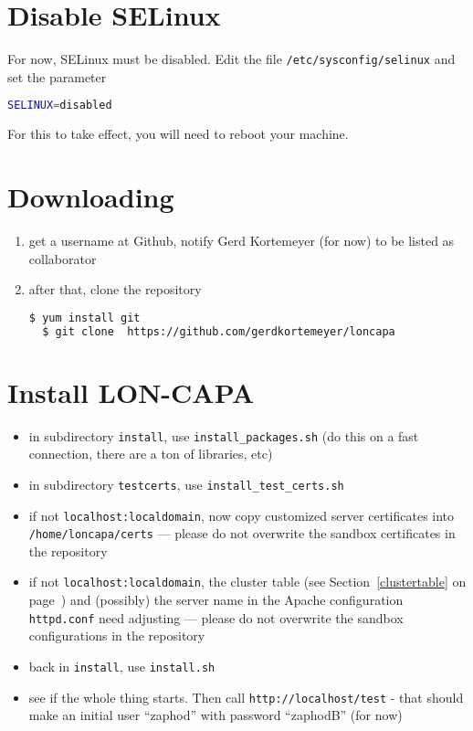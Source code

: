 \section{Disable SELinux}
For now, SELinux must be disabled.  Edit the file {\tt /etc/sysconfig/selinux} and set the parameter 
\begin{lstlisting}[language=bash]
  SELINUX=disabled
\end{lstlisting}
For this to take effect, you will need to reboot your machine.

\section{Downloading}
\begin{enumerate}
\item get a username at Github, notify Gerd Kortemeyer (for now) to be listed as collaborator
\item after that, clone the repository
\begin{lstlisting}[language=bash]
  $ yum install git
  $ git clone  https://github.com/gerdkortemeyer/loncapa
\end{lstlisting}
\end{enumerate}

\section{Install LON-CAPA}
\begin{itemize}
\item in subdirectory {\tt install}, use {\tt install\_packages.sh} (do this on a fast connection, there are a ton of libraries, etc)
\item in subdirectory {\tt testcerts}, use {\tt install\_test\_certs.sh}
\item if not {\tt localhost:localdomain}, now copy customized server certificates into {\tt /home/loncapa/certs} --- please do not overwrite the sandbox certificates in the repository
\item if not {\tt localhost:localdomain}, the cluster table (see Section~\ref{clustertable} on page~\pageref{clustertable}) and (possibly) the server name in the Apache configuration {\tt httpd.conf} need adjusting --- please do not overwrite the sandbox configurations in the repository
\item back in {\tt install}, use {\tt install.sh}
\item see if the whole thing starts. Then call {\tt http://localhost/test} - that should make an initial user ``zaphod'' with password ``zaphodB'' (for now)
\end{itemize}

